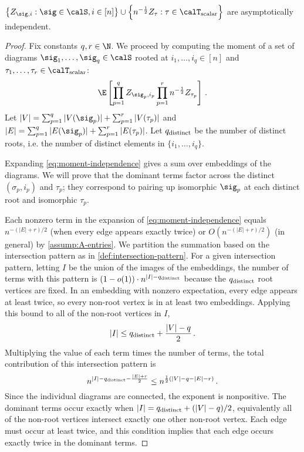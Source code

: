 \documentclass[12pt]{article}
\newcommand{\scalar}{\textnormal{scalar}}
\begin{document}
\begin{lemma}
\label{lem:Ztau-indpt}
    $\left\{Z_{\sig, i} : \sig \in \calS, i \in [n]\right\} \cup \left\{n^{-\frac 1 2}Z_\tau : \tau \in \calT_{\scalar}\right\}$ are asymptotically
    independent.
\end{lemma}
\begin{proof}
    Fix constants $q,r \in \N$.
    We proceed by computing the moment of a set of diagrams $\sig_1, \dots, \sig_q \in \calS$
    rooted at $i_1, \dots, i_q \in [n]$ and $\tau_1, \dots, \tau_r \in \calT_{\scalar}$:
    \begin{align}
        \E\left[\prod_{p=1}^q Z_{\sig_p, i_p} \prod_{p=1}^r n^{-\frac 1 2}Z_{\tau_p}\right]\,.\label{eq:moment-independence}   
    \end{align}
    Let $|V| = \sum_{p = 1}^q |V(\sig_p)| + \sum_{p = 1}^r |V(\tau_p)|$ and $|E| = \sum_{p = 1}^q |E(\sig_p)| + \sum_{p = 1}^r |E(\tau_p)|$.
    Let $q_{\textnormal{distinct}}$ be the number of distinct roots, i.e. the number of distinct elements in $\{i_1, \dots, i_q\}$.

    Expanding \cref{eq:moment-independence} gives a sum over embeddings of the diagrams.
    We will prove that the dominant terms factor across
    the distinct $(\sigma_p, i_p)$ and $\tau_p$; they correspond
    to pairing up isomorphic $\sig_p$ at each distinct root and isomorphic $\tau_p$.

    Each nonzero term in the expansion of \cref{eq:moment-independence} equals $n^{-(|E|+ r)/2}$
    (when every edge appears exactly twice) or $O(n^{-(|E|+ r)/2})$ (in general) by \cref{assump:A-entries}.
    We partition the summation based on the intersection pattern as in \cref{def:intersection-pattern}.
    For a given intersection pattern, letting $I$ be the union of the images of the embeddings,
    the number of terms with this pattern
    is $(1-o(1))\cdot n^{|I| - q_{\textnormal{distinct}}}$ because the $q_{\textnormal{distinct}}$ root vertices are fixed.
    In an embedding with nonzero expectation, every edge appears at least
    twice, so every non-root vertex is in at least two embeddings.
    Applying this bound to all of the non-root vertices in $I$,
    \[|I| \leq q_{\textnormal{distinct}} + \frac {|V| - q}  2\,.\]
    Multiplying the value of each term times the number of terms, the total contribution of this intersection pattern is
    \[n^{|I| - q_{\textnormal{distinct}} - \frac{|E|+r} 2} \le n^{\frac 1 2\left(|V| - q-|E|-r\right)}\,.\]
    Since the individual diagrams are connected, the exponent is nonpositive.
    The dominant terms occur exactly when $|I| = q_{\textnormal{distinct}} + (|V| - q)/2$, equivalently all of the non-root vertices intersect exactly
    one other non-root vertex. Each edge must occur at least twice,
    and this condition implies that each edge occurs exactly twice
    in the dominant terms.


\end{proof}
\end{document}
